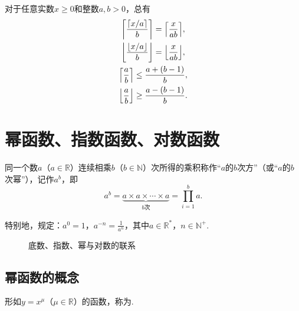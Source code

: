 \begin{property}
对于任意实数\(x \geq 0\)和整数\(a,b>0\)，总有\begin{gather}
\ceil*{\frac{\ceil{x/a}}{b}} = \ceil*{\frac{x}{ab}}, \\
\floor*{\frac{\floor{x/a}}{b}} = \floor*{\frac{x}{ab}}, \\
\ceil*{\frac{a}{b}} \leq \frac{a+(b-1)}{b}, \\
\floor*{\frac{a}{b}} \geq \frac{a-(b-1)}{b}.
\end{gather}
\end{property}

\section{幂函数、指数函数、对数函数}
\begin{definition}
同一个数\(a\)（\(a\in\mathbb{R}\)）连续相乘\(b\)（\(b\in\mathbb{N}\)）次所得的乘积称作“\(a\)的\(b\)次方”（或“\(a\)的\(b\)次幂”），记作\(a^b\)，即\[
a^b = \underbrace{a \times a \times \dotsm \times a}_{b\text{次}} = \prod\limits_{i=1}^b a.
\]

特别地，规定：\(a^0 = 1\)，\(a^{-n} = \frac{1}{a^n}\)，其中\(a\in\mathbb{R}^*\)，\(n\in\mathbb{N}^+\).
\end{definition}

\begin{figure}[ht]
\centering
{}
\caption{底数、指数、幂与对数的联系}\label{figure:函数.底数、指数、幂与对数的联系}
\end{figure}

\subsection{幂函数的概念}
\begin{definition}[幂函数]
形如\(y=x^{\mu}\)（\(\mu \in \mathbb{R}\)）的函数，称为.
\end{definition}

